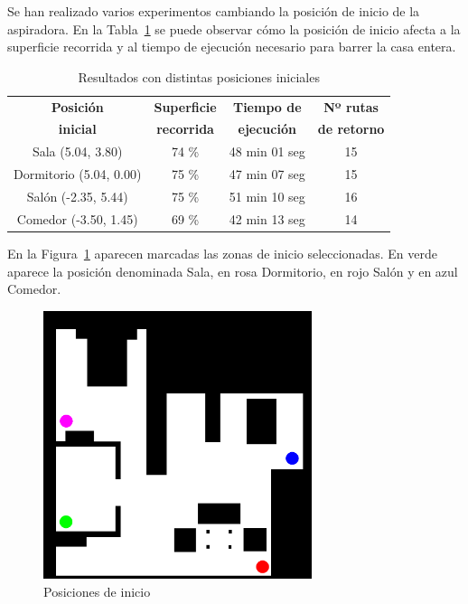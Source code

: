 Se han realizado varios experimentos cambiando la posición de inicio de la aspiradora. En la Tabla~\ref{table:resultados} se puede observar cómo la posición de inicio afecta a la superficie recorrida y al tiempo de ejecución necesario para barrer la casa entera.

\begin{table}[h!]
\centering
\caption{Resultados con distintas posiciones iniciales}
\begin{tabular}{|c|c|c|c|}
\hline
\textbf{Posición}  & \textbf{Superficie} & \textbf{Tiempo de}  & \textbf{Nº rutas} \\
\textbf{inicial}  & \textbf{recorrida} & \textbf{ejecución}  & \textbf{de retorno} \\
\hline
Sala (5.04, 3.80)    & 74 \%                        & 48 min 01 seg                         & 15\\ 
\hline
Dormitorio (5.04, 0.00)         & 75 \%                        & 47 min 07 seg    						& 15\\ 
\hline
Salón (-2.35, 5.44)          & 75 \%                        & 51 min 10 seg    						& 16\\ 
\hline
Comedor (-3.50, 1.45)      & 69 \%                        & 42 min 13 seg    						& 14\\ 
\hline
\end{tabular}

\label{table:resultados}
\end{table}

En la Figura~\ref{fig.posInicio} aparecen marcadas las zonas de inicio seleccionadas. En verde aparece la posición denominada Sala, en rosa Dormitorio, en rojo Salón y en azul Comedor.

\begin{figure}[H]
  \begin{center}
    \includegraphics[width=0.7\textwidth]{figures/Vacuum/mapaPosInicio.png}
		\caption{Posiciones de inicio}
		\label{fig.posInicio}
		\end{center}
\end{figure}


